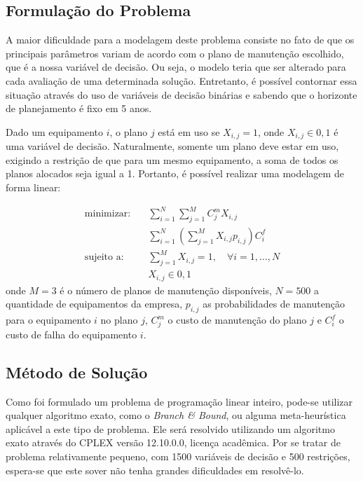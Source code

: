\documentclass[conference]{IEEEtran}
\begin{document}
\subsection{Formulação do Problema}

A maior dificuldade para a modelagem deste problema consiste no fato de que os principais parâmetros variam de acordo com o plano de manutenção escolhido, que é a nossa variável de decisão. Ou seja, o modelo teria que ser alterado para cada avaliação de uma determinada solução. Entretanto, é possível contornar essa situação através do uso de variáveis de decisão binárias e sabendo que o horizonte de planejamento é fixo em 5 anos.

Dado um equipamento $i$, o plano $j$ está em uso se $X_{i,j} = 1$, onde $X_{i,j} \in {0,1}$ é uma variável de decisão. Naturalmente, somente um plano deve estar em uso, exigindo a restrição de que para um mesmo equipamento, a soma de todos os planos alocados seja igual a 1. Portanto, é possível realizar uma modelagem de forma linear:

\begin{equation}
	\begin{alignedat}{2}
		\text{minimizar:} & \quad \sum_{i=1}^{N}\sum_{j=1}^{M}C_j^{m}X_{i,j}  \\
						 & \quad \sum_{i=1}^{N}(\sum_{j=1}^{M}X_{i,j}p_{i,j})C_i^f \\
		\text{sujeito a:} & \quad \sum_{j=1}^{M}X_{i,j} = 1, \quad \forall i = 1,\dots,N \\
    	& \quad X_{i,j} \in {0,1}
	\end{alignedat}
	\label{eq:model}
\end{equation}
onde $M = 3$ é o número de planos de manutenção disponíveis, $N = 500$ a quantidade de equipamentos da empresa, $p_{i,j}$ as probabilidades de manutenção para o equipamento $i$ no plano $j$, $C_j^{m}$ o custo de manutenção do plano $j$ e $C_i^f$ o custo de falha do equipamento $i$.

\subsection{Método de Solução}

Como foi formulado um problema de programação linear inteiro, pode-se utilizar qualquer algoritmo exato, como o \textit{Branch \& Bound}, ou alguma meta-heurística aplicável a este tipo de problema. Ele será resolvido utilizando um algoritmo exato através do CPLEX versão 12.10.0.0, licença acadêmica. Por se tratar de problema relativamente pequeno, com 1500 variáveis de decisão e 500 restrições, espera-se que este sover não tenha grandes dificuldades em resolvê-lo.
\end{document}

